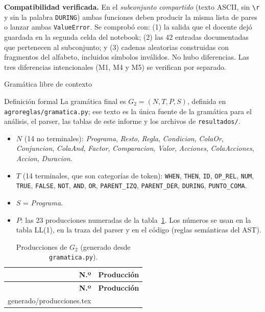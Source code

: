 \documentclass[11pt,letterpaper]{article}
\makeatletter
\renewcommand\section{\@startsection{section}{1}{\z@}{-3.2ex \@plus -1ex \@minus -.2ex}{1.6ex \@plus .2ex}%
  {\normalfont\Large\bfseries\color{acento}}}
\renewcommand\subsection{\@startsection{subsection}{2}{\z@}{-2.6ex\@plus -1ex \@minus -.2ex}{1.0ex \@plus .2ex}%
  {\normalfont\large\bfseries}}
\newcommand{\filas}[1]{\@@input #1 }
\newcommand{\cod}[1]{\texttt{#1}}
\newcommand{\ruta}[1]{\nolinkurl{#1}}
\newcommand{\T}[1]{\texttt{#1}}
\newcommand{\NT}[1]{\textit{#1}}
\newcommand{\cabeza}{\rowcolor{cabecera}}
\makeatother
\begin{document}
\textbf{Compatibilidad verificada.} En el \emph{subconjunto compartido} (texto ASCII, sin \T{\textbackslash r} y
sin la palabra \T{DURING}) ambas funciones deben producir la misma lista de pares o lanzar ambas
\T{ValueError}. Se comprobó con: (1) la salida que el docente dejó guardada en la segunda celda del notebook;
(2) las 42 entradas documentadas que pertenecen al subconjunto; y (3) \NumComparadasLexico{} cadenas
aleatorias construidas con fragmentos del alfabeto, incluidos símbolos inválidos. No hubo diferencias. Las
tres diferencias intencionales (M1, M4 y M5) se verifican por separado.

\section{Gramática libre de contexto}\label{sec:glc}

\subsection{Definición formal}
La gramática final es $G_2 = (N, T, P, S)$, definida en \ruta{agroreglas/gramatica.py}; ese texto es la única
fuente de la gramática para el análisis, el parser, las tablas de este informe y los archivos de
\ruta{resultados/}.

\begin{itemize}
\item $N$ (14 no terminales): \NT{Programa}, \NT{Resto}, \NT{Regla}, \NT{Condicion}, \NT{ColaOr},
\NT{Conjuncion}, \NT{ColaAnd}, \NT{Factor}, \NT{Comparacion}, \NT{Valor}, \NT{Acciones}, \NT{ColaAcciones},
\NT{Accion}, \NT{Duracion}.
\item $T$ (14 terminales, que son categorías de token): \T{WHEN}, \T{THEN}, \T{ID}, \T{OP\_REL}, \T{NUM},
\T{TRUE}, \T{FALSE}, \T{NOT}, \T{AND}, \T{OR}, \T{PARENT\_IZQ}, \T{PARENT\_DER}, \T{DURING}, \T{PUNTO\_COMA}.
\item $S$ = \NT{Programa}.
\item $P$: las 23 producciones numeradas de la tabla~\ref{tab:producciones}. Los números se usan en la tabla
LL(1), en la traza del parser y en el código (reglas semánticas del AST).
\end{itemize}

\begin{longtable}{r>{\raggedright\arraybackslash}p{13.8cm}}
\caption{Producciones de $G_2$ (generado desde \cod{gramatica.py}).}\label{tab:producciones}\\
\hline\cabeza \textbf{N.º} & \textbf{Producción}\\\hline\endfirsthead
\hline\cabeza \textbf{N.º} & \textbf{Producción}\\\hline\endhead
\filas{generado/producciones.tex}
\hline
\end{longtable}
\end{document}
